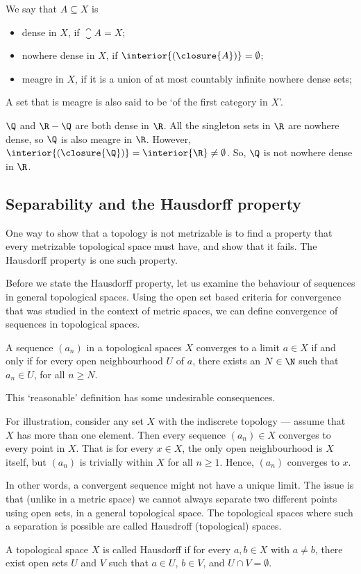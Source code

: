 \begin{ndfn}
  We say that $A \subseteq X$ is
  \begin{itemize}
  \item dense in $X$, if $\closure{A}=X$;
  \item nowhere dense in $X$, if $\interior{(\closure{A})}=\emptyset$;
  \item meagre in $X$, if it is a union of at most countably infinite nowhere dense sets;
  \end{itemize}
\end{ndfn}
A set that is meagre is also said to be `of the first category in $X$'.

\begin{negg}
  $\Q$ and $\R-\Q$ are both dense in $\R$. All the singleton sets in $\R$ are nowhere dense, so $\Q$ is also meagre in $\R$. However, $\interior{(\closure{\Q})} = \interior{\R}\neq\emptyset$. So, $\Q$ is not nowhere dense in $\R$.
\end{negg}

\subsection{Separability and the Hausdorff property}
One way to show that a topology is not metrizable is to find a property that every metrizable topological space must have, and show that it fails. The Hausdorff property is one such property.

Before we state the Hausdorff property, let us examine the behaviour of sequences in general topological spaces. Using the open set based criteria for convergence that was studied in the context of metric spaces, we can define convergence of sequences in topological spaces.
\begin{ndfn}
  A sequence $(a_n)$ in a topological spaces $X$ converges to a limit $a \in X$ if and only if for every open neighbourhood $U$ of $a$, there exists an $N \in \N$ such that $a_n \in U$, for all $n \geq N$.
\end{ndfn}
This `reasonable' definition has some undesirable consequences.

For illustration, consider any set $X$ with the indiscrete topology --- assume that $X$ has more than one element. Then every sequence $(a_n) \in X$ converges to every point in $X$. That is for every $x \in X$, the only open neighbourhood is $X$ itself, but $(a_n)$ is trivially within $X$ for all $n \geq 1$. Hence, $(a_n)$ converges to $x$.

In other words, a convergent sequence might not have a unique limit. The issue is that (unlike in a metric space) we cannot always separate two different points using open sets, in a general topological space. The topological spaces where such a separation is possible are called Hausdroff (topological) spaces.
\begin{ndfn}
  A topological space $X$ is called Hausdorff if for every $a, b \in X$ with $a \neq b$, there exist open sets $U$ and $V$ such that $a \in U$, $b \in V$, and $U \cap V = \emptyset$.
\end{ndfn}

